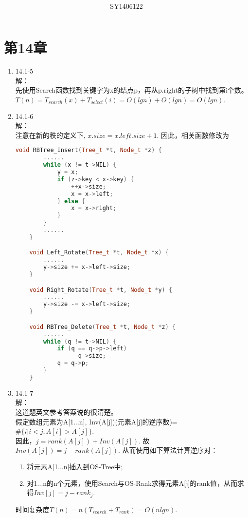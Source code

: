 \documentclass[UTF8]{ctexart}
\begin{document}
\title{\\}
\vspace{2cm}
\author{\\SY1406122}
\date{}
\maketitle

\section*{第14章}
\begin{enumerate}
    \item 14.1-5 \\
    解：\\
        先使用Search函数找到关键字为x的结点p，再从p.right的子树中找到第i个数。\\
		$T(n) = T_{search}(x) + T_{select}(i) = O(lgn) + O(lgn) = O(lgn)$.
		
	
	\item 14.1-6 \\
	解：\\
		注意在新的秩的定义下, $x.size = x.left.size + 1$. 因此，相关函数修改为
	\begin{lstlisting}[language=C++]
	void RBTree_Insert(Tree_t *t, Node_t *z) {
		......
		while (x != t->NIL) {
			y = x;
			if (z->key < x->key) {
				++x->size;
				x = x->left;
			} else {
				x = x->right;
			}
		}
		......
	}

	void Left_Rotate(Tree_t *t, Node_t *x) {
		......
		y->size += x->left->size;
	}

	void Right_Rotate(Tree_t *t, Node_t *y) {
		......
		y->size -= x->left->size;
	}

	void RBTree_Delete(Tree_t *t, Node_t *z) {
		......
		while (q != t->NIL) {
			if (q == q->p->left)
				--q->size;
			q = q->p;
		}
	}
	\end{lstlisting}
	
	\item 14.1-7 \\
	解：\\
		这道题英文参考答案说的很清楚。\\
		假定数组元素为A[1...n],
		Inv(A[j])(元素A[j]的逆序数)=$\#\{i|i<j, A[i]>A[j]\}$. \\
		因此，$j = rank(A[j]) + Inv(A[j])$.
		故$Inv(A[j]) = j - rank(A[j])$. 从而使用如下算法计算逆序对：
		\begin{enumerate}[(1)]
			\item 将元素A[1...n]插入到OS-Tree中;
			\item 对1...n的n个元素，使用Search与OS-Rank求得元素A[j]的rank值，从而求得$Inv[j] = j - rank_j$.
		\end{enumerate}
		时间复杂度$T(n) = n(T_{search} + T_{rank}) = O(nlgn)$.
	

\end{enumerate}
\end{document}
